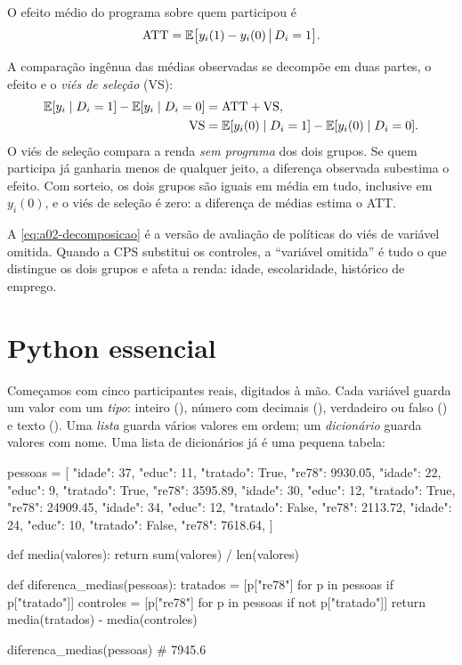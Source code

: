 \begin{definicao}[title={Efeito médio sobre os tratados}]
O efeito médio do programa sobre quem participou é
\[
  \text{ATT} = \mathbb{E}\big[y_i(1) - y_i(0) \,\big|\, D_i = 1\big].
\]
\end{definicao}

A comparação ingênua das médias observadas se decompõe em duas partes, o
efeito e o \emph{viés de seleção} (VS):
\begin{equation}\label{eq:a02-decomposicao}
  \begin{aligned}
    \mathbb{E}[y_i \mid D_i=1] - \mathbb{E}[y_i \mid D_i=0] &= \text{ATT} + \text{VS}, \\
    \text{VS} &= \mathbb{E}[y_i(0) \mid D_i=1] - \mathbb{E}[y_i(0) \mid D_i=0] .
  \end{aligned}
\end{equation}
O viés de seleção compara a renda \emph{sem programa} dos dois grupos. Se quem
participa já ganharia menos de qualquer jeito, a diferença observada subestima
o efeito. Com sorteio, os dois grupos são iguais em média em tudo, inclusive em
$y_i(0)$, e o viés de seleção é zero: a diferença de médias estima o ATT.

\begin{conexao}
A \cref{eq:a02-decomposicao} é a versão de avaliação de políticas do viés de
variável omitida. Quando a CPS substitui os controles, a ``variável omitida'' é
tudo o que distingue os dois grupos e afeta a renda: idade, escolaridade,
histórico de emprego.
\end{conexao}

\section{Python essencial}

Começamos com cinco participantes reais, digitados à mão. Cada variável guarda
um valor com um \emph{tipo}: inteiro (), número com decimais
(), verdadeiro ou falso () e texto (). Uma
\emph{lista} guarda vários valores em ordem; um \emph{dicionário} guarda
valores com nome. Uma lista de dicionários já é uma pequena tabela:

\begin{codigo}
pessoas = [
    {"idade": 37, "educ": 11, "tratado": True,  "re78": 9930.05},
    {"idade": 22, "educ": 9,  "tratado": True,  "re78": 3595.89},
    {"idade": 30, "educ": 12, "tratado": True,  "re78": 24909.45},
    {"idade": 34, "educ": 12, "tratado": False, "re78": 2113.72},
    {"idade": 24, "educ": 10, "tratado": False, "re78": 7618.64},
]

def media(valores):
    return sum(valores) / len(valores)

def diferenca_medias(pessoas):
    tratados = [p["re78"] for p in pessoas if p["tratado"]]
    controles = [p["re78"] for p in pessoas if not p["tratado"]]
    return media(tratados) - media(controles)

diferenca_medias(pessoas)   # 7945.6
\end{codigo}

